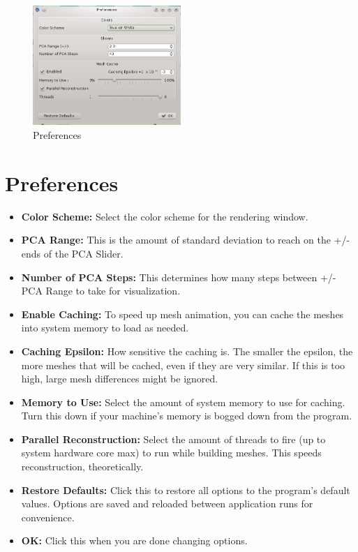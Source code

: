 \documentclass[letterpaper,12pt]{article}   %
\begin{document}
\begin{figure}[!htp]
\centering
    \includegraphics[width=0.5\textwidth]{figs/pref.png}
\caption{Preferences}
\label{fig:pref}
\end{figure}

\section{Preferences}

\begin{itemize}
\item \textbf{Color Scheme:} Select the color scheme for the rendering window.

\item \textbf{PCA Range:} This is the amount of standard deviation to reach on the +/- ends of the PCA Slider.

\item \textbf{Number of PCA Steps:} This determines how many steps between +/- PCA Range to take for visualization.

\item \textbf{Enable Caching:} To speed up mesh animation, you can cache the meshes into system memory to load as needed.

\item \textbf{Caching Epsilon:} How sensitive the caching is. The smaller the epsilon, the more meshes that will be cached, even if they are very similar. If this is too high, large mesh differences might be ignored.

\item \textbf{Memory to Use:} Select the amount of system memory to use for caching. Turn this down if your machine's memory is bogged down from the program.

\item \textbf{Parallel Reconstruction:} Select the amount of threads to fire (up to system hardware core max) to run while building meshes. This speeds reconstruction, theoretically.

\item \textbf{Restore Defaults:} Click this to restore all options to the program's default values. Options are saved and reloaded between application runs for convenience.

\item \textbf{OK:} Click this when you are done changing options.

\end{itemize}
\end{document}
